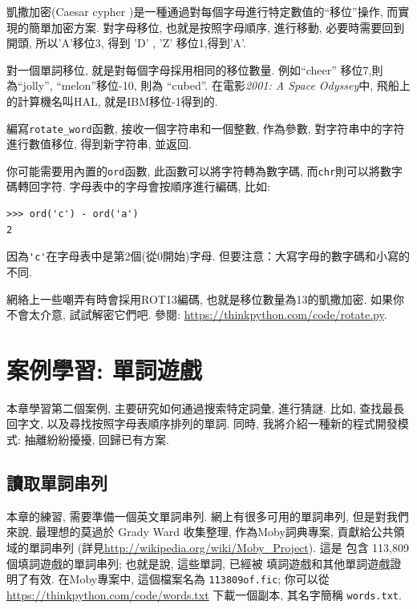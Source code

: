\documentclass[10pt]{book}
\begin{document}
\begin{exercise}

\label{exrotate}
凱撒加密(Caesar cypher )是一種通過對每個字母進行特定數值的``移位''操作, 
而實現的簡單加密方案. 
對字母移位, 也就是按照字母順序, 進行移動, 必要時需要回到開頭,  
所以'A'移位3, 得到 'D' ,   'Z' 移位1,得到'A'. 

對一個單詞移位, 就是對每個字母採用相同的移位數量. 
例如``cheer'' 移位7,則為``jolly'',  ``melon''移位-10, 則為 ``cubed''. 
在電影{\em 2001: A Space Odyssey}中, 飛船上的計算機名叫HAL, 
就是IBM移位-1得到的. 


編寫\verb"rotate_word"函數, 接收一個字符串和一個整數, 作為參數, 
對字符串中的字符進行數值移位, 得到新字符串, 並返回. 

你可能需要用內置的{\tt ord}函數, 此函數可以將字符轉為數字碼, 
而{\tt chr}則可以將數字碼轉回字符. 
字母表中的字母會按順序進行編碼, 比如:

\begin{verbatim}
>>> ord('c') - ord('a')
2
\end{verbatim}
因為\verb"'c'"在字母表中是第2個(從0開始)字母. 
但要注意：大寫字母的數字碼和小寫的不同. 

網絡上一些嘲弄有時會採用ROT13編碼, 也就是移位數量為13的凱撒加密. 
如果你不會太介意, 試試解密它們吧. 參閱:
\url{https://thinkpython.com/code/rotate.py}.

\end{exercise}


\chapter{案例學習: 單詞遊戲}
\label{wordplay}

本章學習第二個案例, 主要研究如何通過搜索特定詞彙, 進行猜謎. 
比如, 查找最長回字文, 以及尋找按照字母表順序排列的單詞. 
同時, 我將介紹一種新的程式開發模式: 抽離紛紛擾擾, 回歸已有方案. 


\section{讀取單詞串列}
\label{wordlist}
本章的練習, 需要準備一個英文單詞串列. 
網上有很多可用的單詞串列, 但是對我們來說, 最理想的莫過於
Grady Ward 收集整理, 作為Moby詞典專案, 貢獻給公共領域的單詞串列
(詳見\url{http://wikipedia.org/wiki/Moby_Project}). 這是
包含 113,809 個填詞遊戲的單詞串列; 也就是說, 這些單詞, 已經被
填詞遊戲和其他單詞遊戲證明了有效. 
在Moby專案中, 這個檔案名為 {\tt 113809of.fic};
你可以從\url{https://thinkpython.com/code/words.txt} 下載一個副本, 
其名字簡稱 {\tt words.txt}. 
\end{document}
